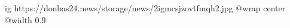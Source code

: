 
 
 
 
 

\ifcmt
  ig https://donbas24.news/storage/news/2igmcsjzovtfmqh2.jpg
  @wrap center
  @width 0.9
\fi
